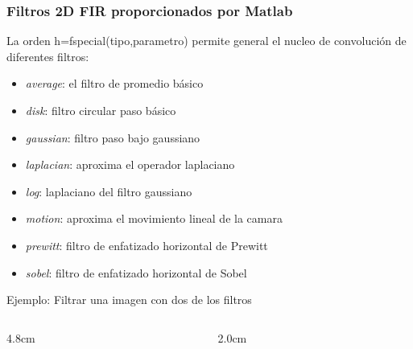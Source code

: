 \begin{frame}
\frametitle{Filtros 2D FIR proporcionados por Matlab}

\small

La orden \alert{h=fspecial(tipo,parametro)} permite general el nucleo de convoluci\'{o}n de diferentes filtros:

\footnotesize

\begin{itemize}

\item \alert{\textit{average}}: el filtro de promedio b\'{a}sico

\item \alert{\textit{disk}}: filtro circular paso b\'{a}sico

\item \alert{\textit{gaussian}}: filtro paso bajo gaussiano

\item \alert{\textit{laplacian}}: aproxima el operador laplaciano

\item \alert{\textit{log}}: laplaciano del filtro gaussiano

\item \alert{\textit{motion}}: aproxima el movimiento lineal de la camara

\item \alert{\textit{prewitt}}: filtro de enfatizado horizontal de Prewitt

\item \alert{\textit{sobel}}: filtro de enfatizado horizontal de Sobel

\end{itemize}

\small

\vspace{0.0cm}

\color{olivegreen}Ejemplo: \color{black} Filtrar una imagen con dos de los filtros

\vspace{-0.8cm}


\begin{columns}[t]

\begin{column}{4.8cm}



\end{column}

\begin{column}{2.0cm}


\end{column}
\end{columns}
\end{frame}
